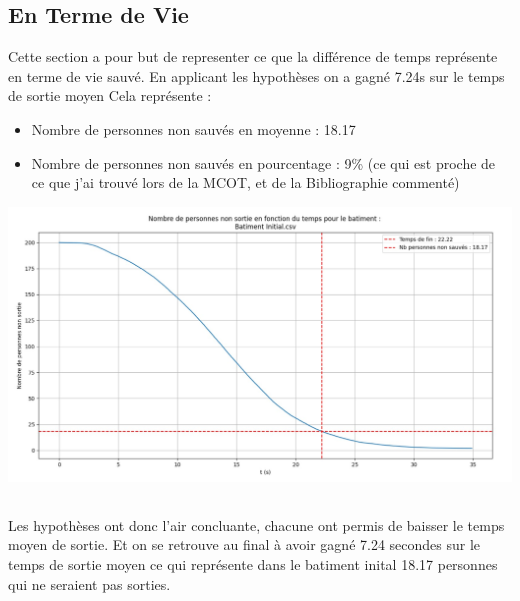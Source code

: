 \documentclass[12pt]{article}
\begin{document}
\subsection{En Terme de Vie}
Cette section a pour but de representer ce que la différence de temps représente en terme de vie sauvé.
\newline\newline
En applicant les hypothèses on a gagné 7.24s sur le temps de sortie moyen
\newline\newline
Cela représente :
\begin{itemize}
    \item Nombre de personnes non sauvés en moyenne : 18.17
    \item Nombre de personnes non sauvés en pourcentage : 9\% (ce qui est proche de ce que j'ai trouvé lors de la MCOT, et de la Bibliographie commenté)
\end{itemize}
\includegraphics[scale=0.5]{Nombre_personnes_non_sauve.jpg}
\newline
\subsection{}
Les hypothèses ont donc l'air concluante, chacune ont permis de baisser le temps moyen de sortie. Et on se 
retrouve au final à avoir gagné 7.24 secondes sur le temps de sortie moyen ce qui représente dans le batiment inital 18.17 
personnes qui ne seraient pas sorties.
\end{document}
